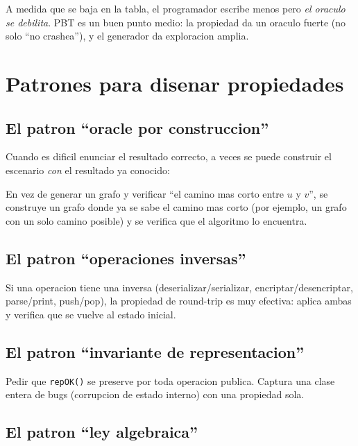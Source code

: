 \documentclass[12pt,a4paper]{article}
\begin{document}
\begin{ideabox}
A medida que se baja en la tabla, el programador escribe menos pero \emph{el oraculo se
debilita}. PBT es un buen punto medio: la propiedad da un oraculo fuerte (no solo ``no
crashea''), y el generador da exploracion amplia.
\end{ideabox}

\section{Patrones para disenar propiedades}

\subsection{El patron ``oracle por construccion''}

Cuando es dificil enunciar el resultado correcto, a veces se puede construir el escenario
\emph{con} el resultado ya conocido:

\begin{ejemplobox}
En vez de generar un grafo y verificar ``el camino mas corto entre $u$ y $v$'', se construye
un grafo donde ya se sabe el camino mas corto (por ejemplo, un grafo con un solo camino
posible) y se verifica que el algoritmo lo encuentra.
\end{ejemplobox}

\subsection{El patron ``operaciones inversas''}

Si una operacion tiene una inversa (deserializar/serializar, encriptar/desencriptar,
parse/print, push/pop), la propiedad de round-trip es muy efectiva: aplica ambas y verifica
que se vuelve al estado inicial.

\subsection{El patron ``invariante de representacion''}

Pedir que \texttt{repOK()} se preserve por toda operacion publica. Captura una clase entera
de bugs (corrupcion de estado interno) con una propiedad sola.

\subsection{El patron ``ley algebraica''}
\end{document}
